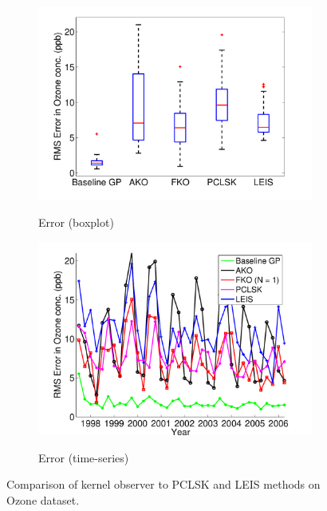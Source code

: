 \documentclass[letterpaper,12pt,peerreviewca,draftcls]{IEEEtran}
\begin{document}
\begin{figure}
\begin{minipage}{0.8\textwidth}
	\begin{subfigure}[t]{0.48\textwidth}
		\includegraphics[width=\linewidth]{"Figure 12a"} \label{fig:ozone_boxplots}
		\caption{Error (boxplot)}
	\end{subfigure}
	\begin{subfigure}[t]{0.48\textwidth}
		\includegraphics[width=\linewidth]{"Figure 12b"} \label{fig:ozone_comp}
		\caption{Error (time-series)}
	\end{subfigure}
	\caption{Comparison of kernel observer to PCLSK and LEIS methods on Ozone dataset.}\label{ozone}
\end{minipage}
\end{figure}
\end{document}
